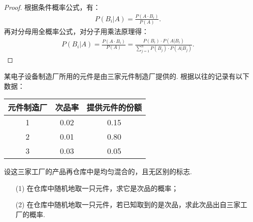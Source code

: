 \documentclass[12pt, a4paper, oneside, UTF8]{ctexbook}
\begin{document}
\begin{proof}
    根据条件概率公式，有：
    \begin{align*}
        P\left(B_i | A\right) = \frac{P\left(A\cdot B_i\right)}{P\left(A\right)}.
    \end{align*}
    再对分母用全概率公式，对分子用乘法原理得：
    \begin{align*}
        P\left(B_i | A\right) = \frac{P\left(A\cdot B_i\right)}{P\left(A\right)} = \frac{P\left(B_i\right) \cdot P\left(A | B_i\right)}{\sum_{j = 1}^{n}P\left(B_j\right) \cdot P\left(A | B_j\right)}.
    \end{align*}
\end{proof}

\clearpage

\begin{example}
    某电子设备制造厂所用的元件是由三家元件制造厂提供的. 根据以往的记录有以下数据：
    \begin{table*}[h]
        \centering
        \renewcommand\arraystretch{1}
        \setlength{\tabcolsep}{15mm}
        \begin{tabular}[h]{c|c|c}
            \hline
            元件制造厂 & 次品率 & 提供元件的份额 \\ \hline
            1 & 0.02 & 0.15 \\ 
            2 & 0.01 & 0.80 \\ 
            3 & 0.03 & 0.05 \\ 
            \hline
        \end{tabular}
    \end{table*}

    设这三家工厂的产品再仓库中是均匀混合的，且无区别的标志. 
    \begin{enumerate}
        \item[(1)] 在仓库中随机地取一只元件，求它是次品的概率；
        \item[(2)] 在仓库中随机地取一只元件，若已知取到的是次品，求此次品出自三家工厂的概率.
    \end{enumerate}
\end{example}
\end{document}
